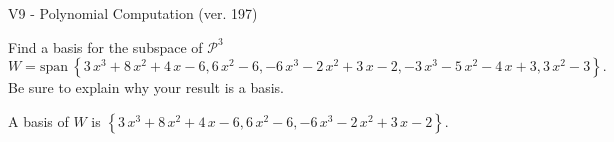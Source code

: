 \begin{exercise}
  \begin{exerciseTitle}V9 - Polynomial Computation (ver. 197)\end{exerciseTitle}
  \begin{exerciseStatement}
    Find a basis for the subspace of \(\mathcal{P}^3\) 
\[W=\mathrm{span}\ \left\{3 \, x^{3} + 8 \, x^{2} + 4 \, x - 6 , 6 \, x^{2} - 6 , -6 \, x^{3} - 2 \, x^{2} + 3 \, x - 2 , -3 \, x^{3} - 5 \, x^{2} - 4 \, x + 3 , 3 \, x^{2} - 3\right\}.\]
 Be sure to explain why your result is a basis.


  \end{exerciseStatement}
  \begin{exerciseAnswer}
   A basis of \(W\) is  \(\left\{3 \, x^{3} + 8 \, x^{2} + 4 \, x - 6 , 6 \, x^{2} - 6 , -6 \, x^{3} - 2 \, x^{2} + 3 \, x - 2\right\}\).
  


  \end{exerciseAnswer}
\end{exercise}
